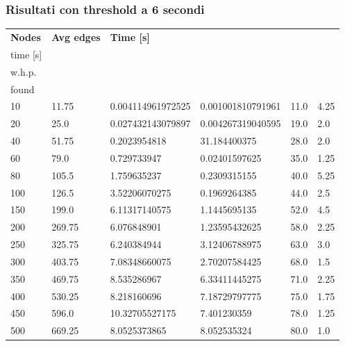 \subsubsection{Risultati con threshold a 6 secondi}
\begin{longtable}{llllll}
  \textbf{Nodes} & \textbf{Avg edges} & \textbf{Time {[}s{]}} & \textbf{\begin{tabular}[c]{@{}l@{}}Discovery\\ time {[}s{]}\end{tabular}} & \textbf{\begin{tabular}[c]{@{}l@{}}Avg rep\\ w.h.p.\end{tabular}} & \textbf{\begin{tabular}[c]{@{}l@{}}Avg mincut\\ found\end{tabular}} \\
  \endhead
  10 & 11.75 & 0.004114961972525 & 0.001001810791961 & 11.0 & 4.25 \\
  20 & 25.0 & 0.027432143079897 & 0.004267319040595 & 19.0 & 2.0 \\
  40 & 51.75 & 0.2023954818 & 31.184400375 & 28.0 & 2.0 \\
  60 & 79.0 & 0.729733947 & 0.02401597625 & 35.0 & 1.25 \\
  80 & 105.5 & 1.759635237 & 0.2309315155 & 40.0 & 5.25 \\
  100 & 126.5 & 3.52206070275 & 0.1969264385 & 44.0 & 2.5 \\
  150 & 199.0 & 6.11317140575 & 1.1445695135 & 52.0 & 4.5 \\
  200 & 269.75 & 6.076848901 & 1.23595432625 & 58.0 & 2.25 \\
  250 & 325.75 & 6.240384944 & 3.12406788975 & 63.0 & 3.0 \\
  300 & 403.75 & 7.08348660075 & 2.70207584425 & 68.0 & 1.5 \\
  350 & 469.75 & 8.535286967 & 6.33411445275 & 71.0 & 2.25 \\
  400 & 530.25 & 8.218160696 & 7.18729797775 & 75.0 & 1.75 \\
  450 & 596.0 & 10.32705527175 & 7.401230359 & 78.0 & 1.25 \\
  500 & 669.25 & 8.0525373865 & 8.052535324 & 80.0 & 1.0
  \end{longtable}

